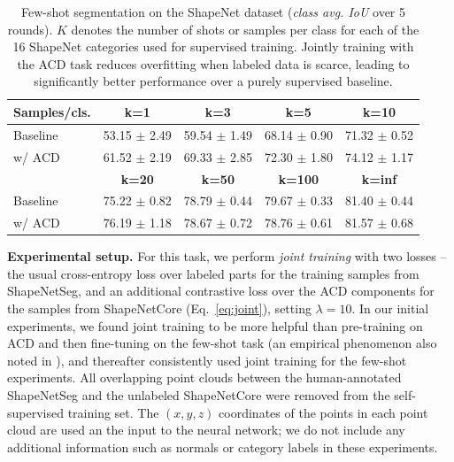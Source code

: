 \begin{table}[t]
\centering
\caption{\small{Few-shot segmentation on the ShapeNet dataset (\textit{class avg. IoU} over 5 rounds). $K$ denotes the number of shots or samples per class for each of the 16 ShapeNet categories used for supervised training. Jointly training with the ACD task reduces overfitting when labeled data is scarce, leading to significantly better performance over a purely supervised baseline.
}}
\label{tab:shapenet}
\begin{tabular}{@{\extracolsep{5pt}}lcccc}
\toprule
Samples/cls.    & \textbf{k=1}      & \textbf{k=3}      & \textbf{k=5}     & \textbf{k=10}   \\
\midrule 
  Baseline      & 53.15 $\pm$ 2.49  & 59.54 $\pm$ 1.49  & 68.14 $\pm$ 0.90 & 71.32 $\pm$ 0.52  \\
  w/ ACD        & 61.52 $\pm$ 2.19  & 69.33 $\pm$ 2.85  & 72.30 $\pm$ 1.80 & 74.12 $\pm$ 1.17  \\
\toprule
                & \textbf{k=20}     & \textbf{k=50}      & \textbf{k=100}      & \textbf{k=inf}   \\
\midrule
  Baseline      & 75.22 $\pm$ 0.82  &  78.79 $\pm$ 0.44  &  79.67 $\pm$ 0.33   & 81.40 $\pm$ 0.44  \\
  w/ ACD        & 76.19 $\pm$ 1.18  &  78.67 $\pm$ 0.72  &  78.76 $\pm$ 0.61   & 81.57 $\pm$ 0.68  \\
  
\bottomrule
\end{tabular}
\end{table}


\noindent
\textbf{Experimental setup.} 
 For this task, we perform \textit{joint training} with two losses -- the usual cross-entropy loss over labeled parts for the training samples from ShapeNetSeg, and an additional contrastive loss over the ACD components for the samples from ShapeNetCore (Eq.~\ref{eq:joint}), setting $\lambda = 10$. In our initial experiments, we found joint training to be more helpful than pre-training on ACD and then fine-tuning on the few-shot task (an empirical phenomenon also noted in \cite{xie2019self}), and thereafter consistently used joint training for the few-shot experiments. All overlapping point clouds between the human-annotated ShapeNetSeg and the unlabeled ShapeNetCore were removed from the self-supervised training set. The $(x, y, z)$ coordinates of the points in each point cloud are used an the input to the neural network; we do not include any additional information such as normals or category labels in these experiments.


